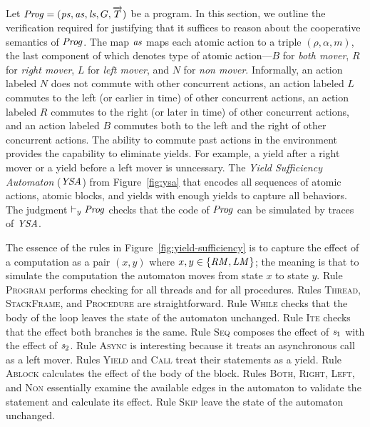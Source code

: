 Let $\mathit{Prog} = (\mathit{ps}, \mathit{as}, \mathit{ls}, G, \overrightarrow{T})$ be a program.
In this section, we outline the verification required for justifying that it suffices to reason about
the cooperative semantics of $\mathit{Prog}$.
The map $\mathit{as}$ maps each atomic action to a triple $(\rho, \alpha, m)$, the last component of which 
denotes type of atomic action---$B$ for {\em both mover}, $R$ for {\em right mover}, $L$ for {\em left mover},
and $N$ for {\em non mover}.
Informally, an action labeled $N$ does not commute with other concurrent actions,
an action labeled $L$ commutes to the left (or earlier in time) of other concurrent actions,
an action labeled $R$ commutes to the right (or later in time) of other concurrent actions,
and an action labeled $B$ commutes both to the left and the right of other concurrent actions.
The ability to commute past actions in the environment provides the capability to eliminate yields.
For example, a yield after a right mover or a yield before a left mover is unncessary.
The {\em Yield Sufficiency Automaton\/} ($\mathit{YSA}$) from Figure~\ref{fig:ysa} that encodes 
all sequences of atomic actions, atomic blocks, and yields with enough yields to capture all behaviors.
The judgment $\vdash_y \mathit{Prog}$ checks that the code of $\mathit{Prog}$ can be simulated by traces of $\mathit{YSA}$.

The essence of the rules in Figure~\ref{fig:yield-sufficiency}
is to capture the effect of a computation as a pair $(x,y)$ where $x,y \in \{\mathit{RM},\mathit{LM}\}$;
the meaning is that to simulate the computation the automaton moves from state $x$ to state $y$.
Rule \textsc{Program} performs checking for all threads and for all procedures.
Rules \textsc{Thread}, \textsc{StackFrame}, and \textsc{Procedure} are straightforward.
Rule \textsc{While} checks that the body of the loop leaves the state of the automaton unchanged.
Rule \textsc{Ite} checks that the effect both branches is the same.
Rule \textsc{Seq} composes the effect of $\mathit{s}_1$ with the effect of $\mathit{s}_2$.
Rule \textsc{Async} is interesting because it treats an asynchronous call as a left mover.
Rules \textsc{Yield} and \textsc{Call} treat their statements as a yield.
Rule \textsc{Ablock} calculates the effect of the body of the block.
Rules \textsc{Both}, \textsc{Right}, \textsc{Left}, and \textsc{Non} essentially 
examine the available edges in the automaton to validate the statement and calculate its effect.
Rule \textsc{Skip} leave the state of the automaton unchanged.

